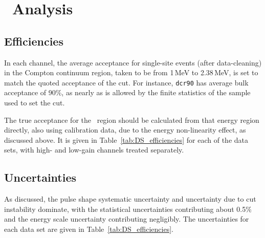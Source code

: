 \documentclass[groupedaddress,rmp,amsmath,amssymb,bibnotes,altaffilletter,twocolumn]{revtex4-1}
\begin{document}
\section{\MJ\ Analysis}
\subsection{Efficiencies}
In each channel, the average acceptance for single-site events (after data-cleaning) in the Compton continuum region, taken to be from 1\,MeV to 2.38\,MeV, is set to match the quoted acceptance of the cut. For instance, {\tt dcr90} has average bulk acceptance of 90\%, as nearly as is allowed by the finite statistics of the sample used to set the cut. 

The true acceptance for the \nonubb\ region should be calculated from that energy region directly, also using calibration data, due to the energy non-linearity effect, as discussed above. It is given in Table~\ref{tab:DS_efficiencies} for each of the data sets, with high- and low-gain channels treated separately.  

\subsection{Uncertainties}
As discussed, the pulse shape systematic uncertainty and uncertainty due to cut instability dominate, with the statistical uncertainties contributing about 0.5\% and the energy scale uncertainty contributing negligibly. The uncertainties for each data set are given in Table~\ref{tab:DS_efficiencies}. 
\end{document}
